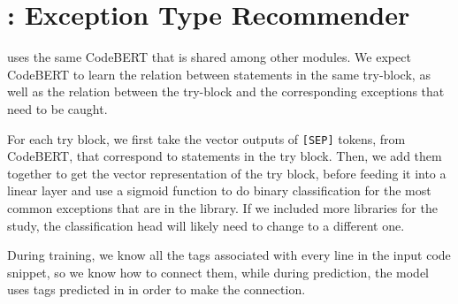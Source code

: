 \section{{\xtype}: Exception Type Recommender}
\label{sec:type}

{\xtype} uses the same CodeBERT that is shared  among other modules. We expect CodeBERT to learn the relation between statements in the same try-block, 
as well as the relation between the try-block and the corresponding exceptions that need to be caught. 

For each try block, we first take the vector outputs of \texttt{[SEP]} tokens, from CodeBERT, that correspond to statements in the try block. Then, we add them together 
to get the vector representation of the try block, before feeding it into a linear layer and use a sigmoid function to do binary classification for the most common exceptions
that are in the library. If we included more libraries for the study, the classification head will likely need to change to a different one.

During training, we know all the tags associated with every line in the input code snippet, so we know how to connect them, while during prediction, the model uses tags predicted in {\xstate} in order to make the connection.



%
%
